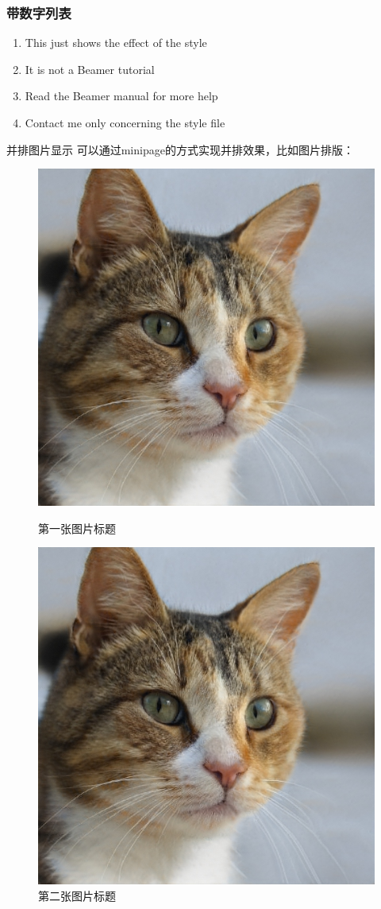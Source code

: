 \documentclass[10pt,aspectratio=169]{beamer}
\begin{document}
\begin{frame}
	\frametitle{带数字列表}
	\begin{enumerate}
		\item This just shows the effect of the style
		\item It is not a Beamer tutorial
		\item Read the Beamer manual for more help
		\item Contact me only concerning the style file
	\end{enumerate}
\end{frame}

\begin{frame}{并排图片显示}
可以通过minipage的方式实现并排效果，比如图片排版：
	\begin{figure}[ht]
		\centering
		\begin{minipage}[b]{0.45\linewidth} %
			\centering
			\includegraphics[width=0.5\linewidth]{example.png}
			\caption{第一张图片标题}
			\label{fig:image1}
		\end{minipage}
		\hfill %
		\begin{minipage}[b]{0.45\linewidth} %
			\centering
			\includegraphics[width=0.5\linewidth]{example.png}
			\caption{第二张图片标题}
			\label{fig:image2}
		\end{minipage}
	\end{figure}
\end{frame}
	
\end{document}
